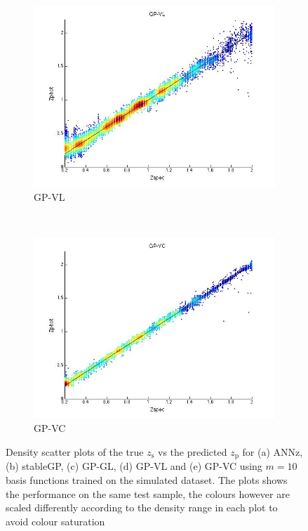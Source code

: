 \documentclass[useAMS,usenatbib,fleqn]{mn2e}
\begin{document}
\begin{figure}
        \begin{subfigure}[b]{0.3\textwidth}
               \includegraphics[width=\textwidth]{figures/GPVL}
                \caption{GP-VL}
                \label{GPVL-plot}
        \end{subfigure}
        ~
        \begin{subfigure}[b]{0.3\textwidth}
                \includegraphics[width=\textwidth]{figures/GPVC}
                \caption{GP-VC}
                \label{GPVC-plot}
        \end{subfigure}
        
        \caption{Density scatter plots of the true $z_\textrm{s}$ vs the predicted $z_\textrm{p}$ for (a) {\sc ANNz}, (b) {\sc stableGP}, (c) GP-GL, (d) GP-VL and (e) GP-VC using $m=10$ basis functions trained on the simulated dataset. The plots shows the performance on the same test sample, the colours however are scaled differently according to the density range in each plot to avoid colour saturation}
        \label{fig-methods-plots}
\end{figure}
\end{document}

